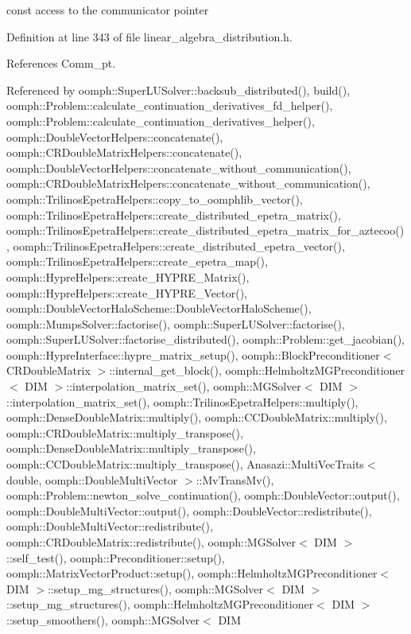 const access to the communicator pointer 



Definition at line 343 of file linear\+\_\+algebra\+\_\+distribution.\+h.



References Comm\+\_\+pt.



Referenced by oomph\+::\+Super\+L\+U\+Solver\+::backsub\+\_\+distributed(), build(), oomph\+::\+Problem\+::calculate\+\_\+continuation\+\_\+derivatives\+\_\+fd\+\_\+helper(), oomph\+::\+Problem\+::calculate\+\_\+continuation\+\_\+derivatives\+\_\+helper(), oomph\+::\+Double\+Vector\+Helpers\+::concatenate(), oomph\+::\+C\+R\+Double\+Matrix\+Helpers\+::concatenate(), oomph\+::\+Double\+Vector\+Helpers\+::concatenate\+\_\+without\+\_\+communication(), oomph\+::\+C\+R\+Double\+Matrix\+Helpers\+::concatenate\+\_\+without\+\_\+communication(), oomph\+::\+Trilinos\+Epetra\+Helpers\+::copy\+\_\+to\+\_\+oomphlib\+\_\+vector(), oomph\+::\+Trilinos\+Epetra\+Helpers\+::create\+\_\+distributed\+\_\+epetra\+\_\+matrix(), oomph\+::\+Trilinos\+Epetra\+Helpers\+::create\+\_\+distributed\+\_\+epetra\+\_\+matrix\+\_\+for\+\_\+aztecoo(), oomph\+::\+Trilinos\+Epetra\+Helpers\+::create\+\_\+distributed\+\_\+epetra\+\_\+vector(), oomph\+::\+Trilinos\+Epetra\+Helpers\+::create\+\_\+epetra\+\_\+map(), oomph\+::\+Hypre\+Helpers\+::create\+\_\+\+H\+Y\+P\+R\+E\+\_\+\+Matrix(), oomph\+::\+Hypre\+Helpers\+::create\+\_\+\+H\+Y\+P\+R\+E\+\_\+\+Vector(), oomph\+::\+Double\+Vector\+Halo\+Scheme\+::\+Double\+Vector\+Halo\+Scheme(), oomph\+::\+Mumps\+Solver\+::factorise(), oomph\+::\+Super\+L\+U\+Solver\+::factorise(), oomph\+::\+Super\+L\+U\+Solver\+::factorise\+\_\+distributed(), oomph\+::\+Problem\+::get\+\_\+jacobian(), oomph\+::\+Hypre\+Interface\+::hypre\+\_\+matrix\+\_\+setup(), oomph\+::\+Block\+Preconditioner$<$ C\+R\+Double\+Matrix $>$\+::internal\+\_\+get\+\_\+block(), oomph\+::\+Helmholtz\+M\+G\+Preconditioner$<$ D\+I\+M $>$\+::interpolation\+\_\+matrix\+\_\+set(), oomph\+::\+M\+G\+Solver$<$ D\+I\+M $>$\+::interpolation\+\_\+matrix\+\_\+set(), oomph\+::\+Trilinos\+Epetra\+Helpers\+::multiply(), oomph\+::\+Dense\+Double\+Matrix\+::multiply(), oomph\+::\+C\+C\+Double\+Matrix\+::multiply(), oomph\+::\+C\+R\+Double\+Matrix\+::multiply\+\_\+transpose(), oomph\+::\+Dense\+Double\+Matrix\+::multiply\+\_\+transpose(), oomph\+::\+C\+C\+Double\+Matrix\+::multiply\+\_\+transpose(), Anasazi\+::\+Multi\+Vec\+Traits$<$ double, oomph\+::\+Double\+Multi\+Vector $>$\+::\+Mv\+Trans\+Mv(), oomph\+::\+Problem\+::newton\+\_\+solve\+\_\+continuation(), oomph\+::\+Double\+Vector\+::output(), oomph\+::\+Double\+Multi\+Vector\+::output(), oomph\+::\+Double\+Vector\+::redistribute(), oomph\+::\+Double\+Multi\+Vector\+::redistribute(), oomph\+::\+C\+R\+Double\+Matrix\+::redistribute(), oomph\+::\+M\+G\+Solver$<$ D\+I\+M $>$\+::self\+\_\+test(), oomph\+::\+Preconditioner\+::setup(), oomph\+::\+Matrix\+Vector\+Product\+::setup(), oomph\+::\+Helmholtz\+M\+G\+Preconditioner$<$ D\+I\+M $>$\+::setup\+\_\+mg\+\_\+structures(), oomph\+::\+M\+G\+Solver$<$ D\+I\+M $>$\+::setup\+\_\+mg\+\_\+structures(), oomph\+::\+Helmholtz\+M\+G\+Preconditioner$<$ D\+I\+M $>$\+::setup\+\_\+smoothers(), oomph\+::\+M\+G\+Solver$<$ D\+I\+M 
